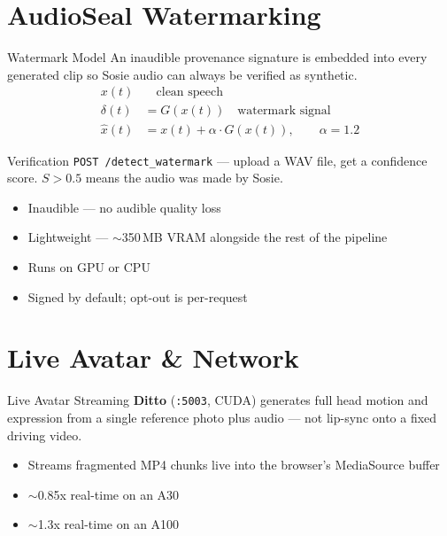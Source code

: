 \documentclass[11pt]{beamer}
\begin{document}
\section{AudioSeal Watermarking}

\begin{frame}{Watermark Model}
  An inaudible provenance signature is embedded into every generated clip so Sosie audio can always be verified as synthetic.
  \begin{align*}
    x(t) &\quad \text{clean speech} \\
    \delta(t) &= G(x(t)) \quad \text{watermark signal} \\
    \hat{x}(t) &= x(t) + \alpha \cdot G(x(t)), \qquad \alpha = 1.2
  \end{align*}
\end{frame}

\begin{frame}[fragile]{Verification}
  \texttt{POST /detect\_watermark} --- upload a WAV file, get a confidence score. $S > 0.5$ means the audio was made by Sosie.
  \begin{itemize}
    \item Inaudible --- no audible quality loss
    \item Lightweight --- $\sim$350\,MB VRAM alongside the rest of the pipeline
    \item Runs on GPU or CPU
    \item Signed by default; opt-out is per-request
  \end{itemize}
\end{frame}

\section{Live Avatar \& Network}

\begin{frame}{Live Avatar Streaming}
  \textbf{Ditto} (\texttt{:5003}, CUDA) generates full head motion and expression from a single reference photo plus audio --- not lip-sync onto a fixed driving video.
  \begin{itemize}
    \item Streams fragmented MP4 chunks live into the browser's MediaSource buffer
    \item $\sim$0.85x real-time on an A30
    \item $\sim$1.3x real-time on an A100
  \end{itemize}
\end{frame}
\end{document}
